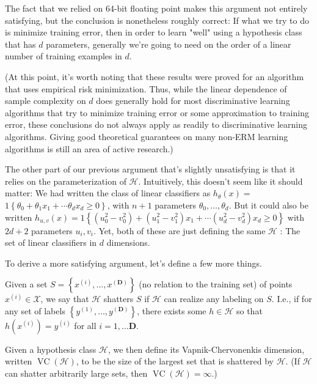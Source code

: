 \documentclass[10pt]{article}
\begin{document}
The fact that we relied on 64-bit floating point makes this argument not entirely satisfying, but the conclusion is nonetheless roughly correct: If what we try to do is minimize training error, then in order to learn "well" using a hypothesis class that has \(d\) parameters, generally we're going to need on the order of a linear number of training examples in \(d\).

(At this point, it's worth noting that these results were proved for an algorithm that uses empirical risk minimization. Thus, while the linear dependence of sample complexity on \(d\) does generally hold for most discriminative learning algorithms that try to minimize training error or some approximation to training error, these conclusions do not always apply as readily to discriminative learning algorithms. Giving good theoretical guarantees on many non-ERM learning algorithms is still an area of active research.)

The other part of our previous argument that's slightly unsatisfying is that it relies on the parameterization of \(\mathcal{H}\). Intuitively, this doesn't seem like it should matter: We had written the class of linear classifiers as \(h_{\theta}(x)=\) \(1\left\{\theta_{0}+\theta_{1} x_{1}+\cdots \theta_{d} x_{d} \geq 0\right\}\), with \(n+1\) parameters \(\theta_{0}, \ldots, \theta_{d}\). But it could also be written \(h_{u, v}(x)=1\left\{\left(u_{0}^{2}-v_{0}^{2}\right)+\left(u_{1}^{2}-v_{1}^{2}\right) x_{1}+\cdots\left(u_{d}^{2}-v_{d}^{2}\right) x_{d} \geq 0\right\}\) with \(2 d+2\) parameters \(u_{i}, v_{i}\). Yet, both of these are just defining the same \(\mathcal{H}\) : The set of linear classifiers in \(d\) dimensions.

To derive a more satisfying argument, let's define a few more things.

Given a set \(S=\left\{x^{(i)}, \ldots, x^{(\mathbf{D})}\right\}\) (no relation to the training set) of points \(x^{(i)} \in \mathcal{X}\), we say that \(\mathcal{H}\) shatters \(S\) if \(\mathcal{H}\) can realize any labeling on \(S\). I.e., if for any set of labels \(\left\{y^{(1)}, \ldots, y^{(\mathbf{D})}\right\}\), there exists some \(h \in \mathcal{H}\) so that \(h\left(x^{(i)}\right)=y^{(i)}\) for all \(i=1, \ldots \mathbf{D}\).

Given a hypothesis class \(\mathcal{H}\), we then define its Vapnik-Chervonenkis dimension, written \(\operatorname{VC}(\mathcal{H})\), to be the size of the largest set that is shattered by \(\mathcal{H}\). (If \(\mathcal{H}\) can shatter arbitrarily large sets, then \(\operatorname{VC}(\mathcal{H})=\infty\).)
\end{document}
